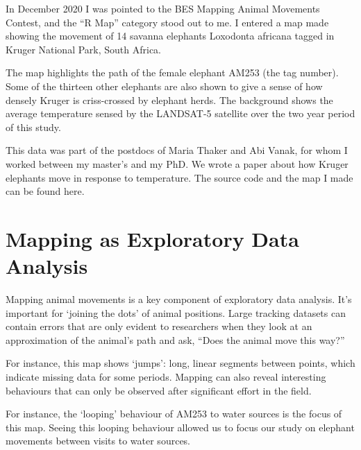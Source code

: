 
\begin{tcolorbox}[
  blanker,
  width=0.99\textwidth,
  before skip=6pt,
  colback=gray,
  breakable]

{

    {}

    \footnotesize\sffamily

    In December 2020 I was pointed to the BES Mapping Animal Movements Contest, and the “R Map” category stood out to me. I entered a map made showing the movement of 14 savanna elephants Loxodonta africana tagged in Kruger National Park, South Africa.

    The map highlights the path of the female elephant AM253 (the tag number). Some of the thirteen other elephants are also shown to give a sense of how densely Kruger is criss-crossed by elephant herds. The background shows the average temperature sensed by the LANDSAT-5 satellite over the two year period of this study.

    This data was part of the postdocs of Maria Thaker and Abi Vanak, for whom I worked between my master’s and my PhD. We wrote a paper about how Kruger elephants move in response to temperature. The source code and the map I made can be found here.

    \section{Mapping as Exploratory Data Analysis}

    Mapping animal movements is a key component of exploratory data analysis. It’s important for ‘joining the dots’ of animal positions. Large tracking datasets can contain errors that are only evident to researchers when they look at an approximation of the animal’s path and ask, “Does the animal move this way?”

    For instance, this map shows ‘jumps’: long, linear segments between points, which indicate missing data for some periods. Mapping can also reveal interesting behaviours that can only be observed after significant effort in the field.

    For instance, the ‘looping’ behaviour of AM253 to water sources is the focus of this map. Seeing this looping behaviour allowed us to focus our study on elephant movements between visits to water sources.

}
\end{tcolorbox}
